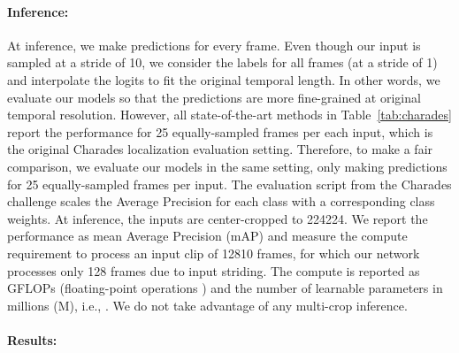 \documentclass[final]{cvpr}
\newcommand{\tref}[1]{Table~\ref{#1}}
\begin{document}
\paragraph{Inference:} At inference, we make predictions for every frame. Even though our input is sampled at a stride of 10, we consider the labels for all frames (at a stride of 1) and interpolate the logits to fit the original temporal length. In other words, we evaluate our models so that the predictions are more fine-grained at original temporal resolution. However, all state-of-the-art methods in \tref{tab:charades} report the performance for 25 equally-sampled frames per each input, which is the original Charades localization evaluation \cite{sigurdsson2016hollywood} setting. Therefore, to make a fair comparison, we evaluate our models in the same setting, only making predictions for 25 equally-sampled frames per input. The evaluation script from the Charades challenge scales the Average Precision for each class with a corresponding class weights.
At inference, the inputs are center-cropped to 224224. We report the performance as mean Average Precision (mAP) and measure the compute requirement to process an input clip of 12810 frames, for which our network processes only 128 frames due to input striding. The compute is reported as GFLOPs (floating-point operations ) and the number of learnable parameters in millions (M), i.e., . We do not take advantage of any multi-crop inference.

	
\vspace{-3pt}
\paragraph{Results:}
\label{subsubsec:main_results}
\end{document}
